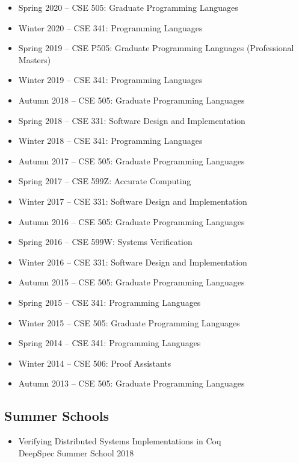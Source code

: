 \documentclass[10pt]{article}
\begin{document}
\begin{itemize}
  \item Spring 2020 -- CSE 505: Graduate Programming Languages
  \item Winter 2020 -- CSE 341: Programming Languages
  \item Spring 2019 -- CSE P505: Graduate Programming Languages (Professional Masters)
  \item Winter 2019 -- CSE 341: Programming Languages
  \item Autumn 2018 -- CSE 505: Graduate Programming Languages
  \item Spring 2018 -- CSE 331: Software Design and Implementation
  \item Winter 2018 -- CSE 341: Programming Languages
  \item Autumn 2017 -- CSE 505: Graduate Programming Languages
  \item Spring 2017 -- CSE 599Z: Accurate Computing
  \item Winter 2017 -- CSE 331: Software Design and Implementation
  \item Autumn 2016 -- CSE 505: Graduate Programming Languages
  \item Spring 2016 -- CSE 599W: Systems Verification
  \item Winter 2016 -- CSE 331: Software Design and Implementation
  \item Autumn 2015 -- CSE 505: Graduate Programming Languages
  \item Spring 2015 -- CSE 341: Programming Languages
  \item Winter 2015 -- CSE 505: Graduate Programming Languages
  \item Spring 2014 -- CSE 341: Programming Languages
  \item Winter 2014 -- CSE 506: Proof Assistants
  \item Autumn 2013 -- CSE 505: Graduate Programming Languages
\end{itemize}


\subsection*{Summer Schools}

\begin{itemize}
  \item Verifying Distributed Systems Implementations in Coq \\
        DeepSpec Summer School 2018
\end{itemize}
\end{document}
